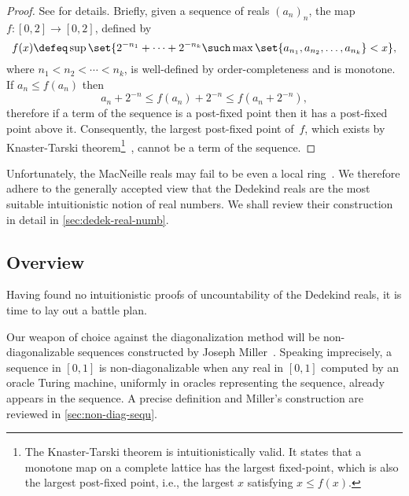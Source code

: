 \begin{proof}
  See \cite{blechschmidt19:_knast_tarsk} for details. Briefly, given a sequence of reals $(a_n)_n$,
  the map $f : [0,2] \to [0,2]$, defined by
  \begin{equation*}
    f(x) \defeq \sup
    \set{ 2^{-n_1} + \cdots + 2^{-n_k} \such
      \max \set{a_{n_1}, a_{n_2}, \ldots, a_{n_k}} < x
    },
  \end{equation*}
  where $n_1 < n_2 < \cdots < n_k$,
  is well-defined by order-completeness and is monotone.
  If $a_n \leq f(a_n)$ then
  \begin{equation*}
    a_n + 2^{-n} \leq
    f(a_n) + 2^{-n} \leq
    f(a_n + 2^{-n}),
  \end{equation*}
  therefore if a term of the sequence is a post-fixed point then it has a post-fixed point above it.
  Consequently, the largest post-fixed point of~$f$, which exists by Knaster-Tarski theorem\footnote{The Knaster-Tarski theorem is intuitionistically valid. It states that a monotone map on a complete lattice has the largest fixed-point, which is also the largest post-fixed point, i.e., the largest $x$ satisfying $x \leq f(x)$.}~\cite{Knaster28,Tarski55}, cannot be a term of the sequence.
\end{proof}

Unfortunately, the MacNeille reals may fail to be even a local ring~\cite[Thm.~D4.7.11]{johnstone02:_sketc_eleph}. We therefore adhere to the generally accepted view that the Dedekind reals are the most suitable intuitionistic notion of real numbers. We shall review their construction in detail in \cref{sec:dedek-real-numb}.

\subsection{Overview}
\label{sec:overview}

Having found no intuitionistic proofs of uncountability of the Dedekind reals, it is time to lay out a battle plan.

Our weapon of choice against the diagonalization method will be non-diagonalizable sequences constructed by Joseph Miller~\cite{miller04:_cont_deg}. Speaking imprecisely, a sequence in $[0,1]$ is non-diagonalizable when any real in $[0,1]$ computed by an oracle Turing machine, uniformly in oracles representing the sequence, already appears in the sequence.
A precise definition and Miller's construction are reviewed in \cref{sec:non-diag-sequ}.

